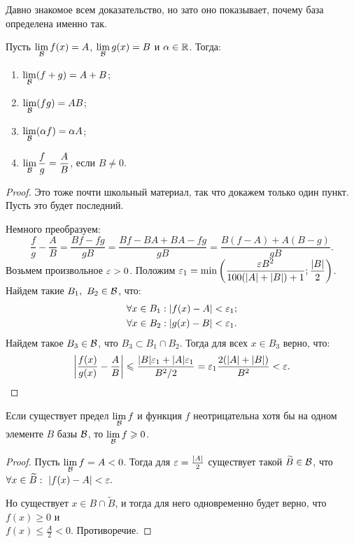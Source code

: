 \documentclass[a4paper, 12pt]{article}
\begin{document}
Давно знакомое всем доказательство, но зато оно показывает, почему база определена именно так.

\begin{Statement}
Пусть $\lim\limits_{\mathcal{B}} f(x) = A$, $\lim\limits_{\mathcal{B}}g(x) = B$ и $\alpha \in \mathbb{R}$. Тогда:
\begin{enumerate}
\item $\lim\limits_{\mathcal{B}}(f + g) = A + B$;
\item $\lim\limits_{\mathcal{B}}(fg) = AB$;
\item $\lim\limits_{\mathcal{B}}(\alpha f) = \alpha A$;
\item $\lim\limits_{\mathcal{B}}\dfrac{f}{g} = \dfrac{A}{B}$, если $B \neq 0$.
\end{enumerate} 
\end{Statement}

\begin{proof}
Это тоже почти школьный материал, так что докажем только один пункт. Пусть это будет последний.

Немного преобразуем:
$$
\frac{f}{g} - \frac{A}{B} = \frac{Bf - fg}{gB} = \frac{Bf - BA + BA - fg}{gB} = \frac{B(f - A) + A(B - g)}{gB}.
$$
Возьмем произвольное $\varepsilon > 0$. Положим $\varepsilon_1 = \min\left( \dfrac{\varepsilon B^2}{100(|A| + |B|) + 1}; \dfrac{|B|}{2} \right)$. Найдем такие $B_1,\ B_2 \in \mathcal{B}$, что:
\begin{gather}
\forall x \in B_1: |f(x) - A| < \varepsilon_1;\\
\forall x \in B_2: |g(x) - B| < \varepsilon_1.
\end{gather}
Найдем такое $B_3 \in \mathcal{B}$, что $B_3 \subset B_1 \cap B_2$. Тогда для всех $x \in B_3$ верно, что:
$$
\left| \frac{f(x)}{g(x)} - \frac{A}{B} \right| \leqslant \frac{|B|\varepsilon_1 + |A|\varepsilon_1}{B^2 / 2} = \varepsilon_1 \frac{2(|A| + |B|)}{B^2} < \varepsilon.
$$
\end{proof}

\begin{Statement}
Если существует предел $\lim\limits_{\mathcal{B}}f$ и функция $f$ неотрицательна хотя бы на одном элементе $B$ базы $\mathcal{B}$, то $\lim\limits_{\mathcal{B}}f \geqslant 0$.
\end{Statement}
\begin{proof}
Пусть $\lim\limits_{\mathcal{B}}f = A < 0$. Тогда для $\varepsilon = \frac{|A|}{2}$ существует такой $\widetilde{B} \in \mathcal{B}$, что $\forall x \in \widetilde{B}:\ |f(x) - A| < \varepsilon.$

Но существует $x \in B \cap \widetilde{B}$, и тогда для него одновременно будет верно, что $f(x) \geq 0$ и\\ $f(x) \leq \frac{A}{2} < 0$. Противоречие.
\end{proof}
\end{document}
